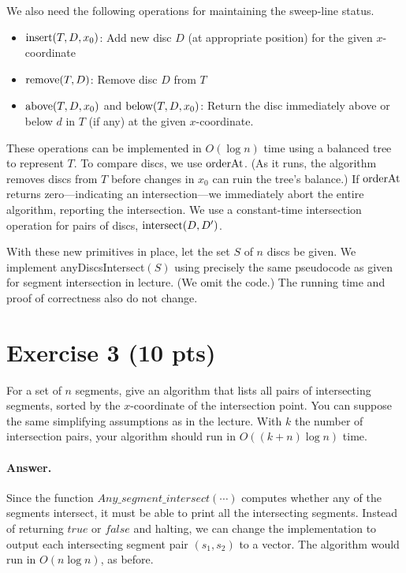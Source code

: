 \documentclass[a4paper]{article}
\begin{document}
We also need the following operations for maintaining the sweep-line status.
\begin{itemize}
\item $\text{insert}(T, D, x_0)$: Add new disc $D$ (at appropriate position) for the given $x$-coordinate
\item $\text{remove}(T,D)$: Remove disc $D$ from $T$
\item $\text{above}(T,D,x_0)$ and $\text{below}(T,D,x_0)$: Return the disc immediately above or below $d$ in $T$ (if any) at the given $x$-coordinate.
\end{itemize}
These operations can be implemented in $O(\log n)$ time using a balanced tree to represent $T$.
To compare discs, we use $\text{orderAt}$.
(As it runs, the algorithm removes discs from $T$ before changes in $x_0$ can ruin the tree's balance.)
If $\text{orderAt}$ returns zero---indicating an intersection---we immediately abort the entire algorithm, reporting the intersection.
{\CHANGE We use a constant-time intersection operation for pairs of discs, $\text{intersect}(D, D')$.}

With these new primitives in place, let the set $S$ of $n$ discs be given.
We implement anyDiscsIntersect$(S)$ using precisely the same pseudocode as given for segment intersection in lecture.
(We omit the code.)
The running time and proof of correctness also do not change.

\section*{Exercise 3 (10 pts)}

For a set of $n$ segments, give an algorithm that lists all pairs of intersecting segments, sorted by the $x$-coordinate of the intersection point. You can suppose the same simplifying assumptions as in the lecture. With $k$ the number of intersection pairs, your algorithm should run in $O((k + n) \log n)$ time.

\paragraph{Answer.}

Since the function ${Any\_segment\_intersect}(\cdots)$ computes whether any of the segments intersect, it must be able to print all the intersecting segments. Instead of returning ${true}$ or ${false}$ and halting, we can change the implementation to output each intersecting segment pair $(s_1, s_2)$ to a vector. The algorithm would run in $O(n \log n)$, as before.
\end{document}
